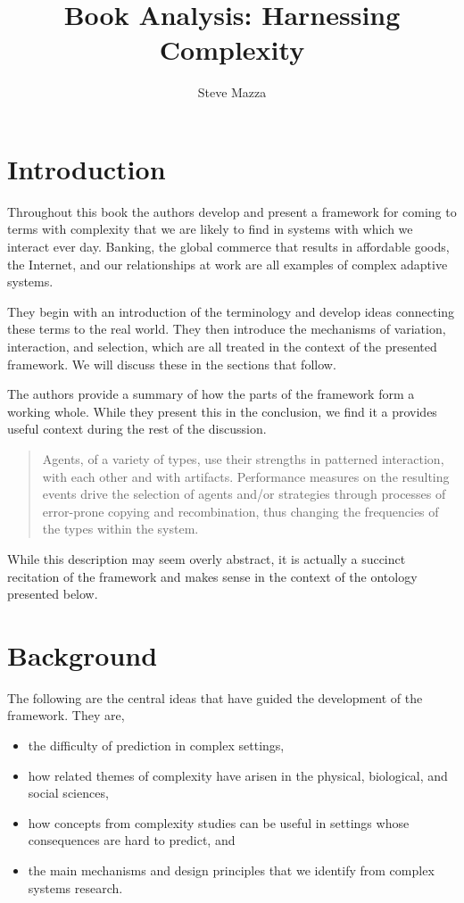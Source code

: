 \documentclass[jou,apacite]{apa6}
\title{Book Analysis: Harnessing Complexity}
\author{Steve Mazza}
\affiliation{Naval Postgraduate School}
\begin{document}
\maketitle    
                        
\section{Introduction}
Throughout this book the authors develop and present a framework for coming to terms with complexity that we are likely to find in systems with which we interact ever day.  Banking, the global commerce that results in affordable goods, the Internet, and our relationships at work are all examples of complex adaptive systems.

They begin with an introduction of the terminology and develop ideas connecting these terms to the real world.  They then introduce the mechanisms of variation, interaction, and selection, which are all treated in the context of the presented framework.  We will discuss these in the sections that follow.

The authors provide a summary of how the parts of the framework form a working whole.  While they present this in the conclusion, we find it a provides useful context during the rest of the discussion.
\begin{quote}
  Agents, of a variety of types, use their strengths in patterned interaction, with each other and with artifacts.  Performance measures on the resulting events drive the selection of agents and/or strategies through processes of error-prone copying and recombination, thus changing the frequencies of the types within the system.~\cite[page 154]{Axelrod}
\end{quote}
While this description may seem overly abstract, it is actually a succinct recitation of the framework and makes sense in the context of the ontology presented below.

\section{Background}

The following are the central ideas that have guided the development of the framework.  They are,
\begin{itemize}
  \item the difficulty of prediction in complex settings,
  \item how related themes of complexity have arisen in the physical, biological, and social sciences,
  \item how concepts from complexity studies can be useful in settings whose consequences are hard to predict, and
  \item the main mechanisms and design principles that we identify from complex systems research.
\end{itemize}
\end{document}
